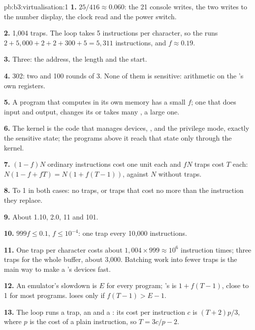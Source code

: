 \begin{solution}{pb:b3:virtualisation:1}
\textbf{1.} $25/416 \approx 0.060$: the 21 console writes, the two writes to the number display, the clock read and the power switch.

\textbf{2.} 1,004 traps. The loop takes 5 instructions per character, so the  runs $2 + 5{,}000 + 2 + 2 + 300 + 5 = 5{,}311$ instructions, and $f \approx 0.19$.

\textbf{3.} Three: the address, the length and the start.

\textbf{4.} 302: two  and 100 rounds of 3. None of them is sensitive: arithmetic on the 's own registers.

\textbf{5.} A program that computes in its own memory has a small $f$; one that does input and output, changes its  or takes many , a large one.

\textbf{6.} The kernel is the code that manages devices, ,  and the privilege mode, exactly the sensitive state; the programs above it reach that state only through the kernel.

\textbf{7.} $(1 - f)N$ ordinary instructions cost one unit each and $fN$ traps cost $T$ each: $N(1 - f + fT) = N(1 + f(T - 1))$, against $N$ without traps.

\textbf{8.} To 1 in both cases: no traps, or traps that cost no more than the instruction they replace.

\textbf{9.} About 1.10, 2.0, 11 and 101.

\textbf{10.} $999 f \le 0.1$, $f \le 10^{-4}$: one trap every 10,000 instructions.

\textbf{11.} One trap per character costs about $1{,}004 \times 999 \approx 10^6$ instruction times; three traps for the whole buffer, about 3,000. Batching work into fewer traps is the main way to make a 's devices fast.

\textbf{12.} An emulator's slowdown is $E$ for every program; 's is $1 + f(T - 1)$, close to 1 for most programs.  loses only if $f(T - 1) > E - 1$.

\textbf{13.} The loop runs a trap, an  and a : its cost per instruction $c$ is $(T + 2)p/3$, where $p$ is the cost of a plain instruction, so $T = 3c/p - 2$.


\end{solution}
